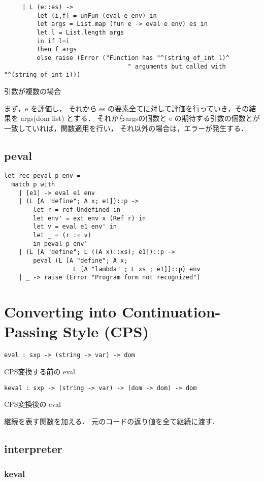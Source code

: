 \documentclass[10pt,a4paper]{jarticle}
\theoremstyle{definition}
\begin{document}
{\small
\begin{verbatim}
     | L (e::es) ->
	     let (i,f) = unFun (eval e env) in
	     let args = List.map (fun e -> eval e env) es in
	     let l = List.length args
	     in if l=i
	     then f args
	     else raise (Error ("Function has "^(string_of_int l)^
				                  " arguments but called with "^(string_of_int i)))
\end{verbatim}}
引数が複数の場合

まず，e を評価し，
それから es の要素全てに対して評価を行っていき，その結果を args(dom list) とする．
それからargsの個数と e の期待する引数の個数とが一致していれば，関数適用を行い，
それ以外の場合は，エラーが発生する．

\subsection{peval}
{\small
\begin{verbatim}
let rec peval p env =
  match p with
    | [e1] -> eval e1 env
    | (L [A "define"; A x; e1])::p ->
        let r = ref Undefined in
        let env' = ext env x (Ref r) in
        let v = eval e1 env' in
        let _ = (r := v)
        in peval p env'
    | (L [A "define"; L ((A x)::xs); e1])::p ->
        peval (L [A "define"; A x;
                   L [A "lambda" ; L xs ; e1]]::p) env
    | _ -> raise (Error "Program form not recognized")
\end{verbatim}}

\section{Converting into Continuation-Passing Style (CPS)}

{\small
\begin{verbatim}
eval : sxp -> (string -> var) -> dom
\end{verbatim}}
CPS変換する前の eval

{\small
\begin{verbatim}
keval : sxp -> (string -> var) -> (dom -> dom) -> dom
\end{verbatim}}
CPS変換後の eval


継続を表す関数を加える．
元のコードの返り値を全て継続に渡す．

\subsection{interpreter}
\subsubsection{keval}
\end{document}

